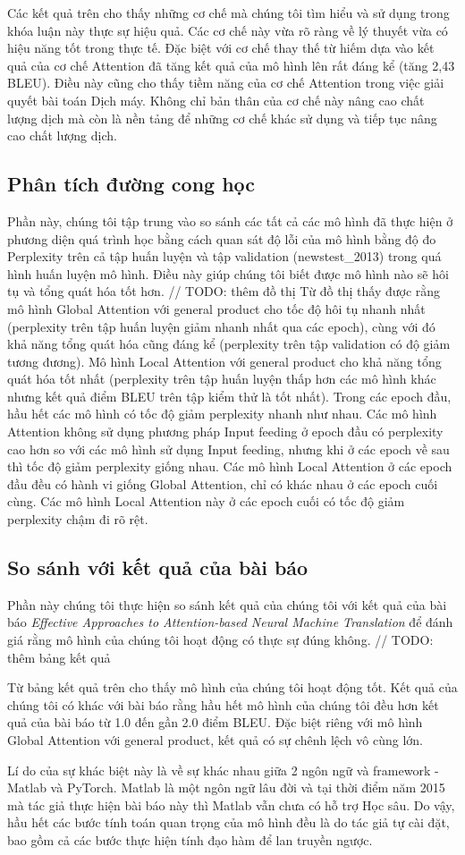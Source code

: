 Các kết quả trên cho thấy những cơ chế mà chúng tôi tìm hiểu và sử dụng trong khóa luận này thực sự hiệu quả. Các cơ chế này vừa rõ ràng về lý thuyết vừa có hiệu năng tốt trong thực tế. Đặc biệt với cơ chế thay thế từ hiếm dựa vào kết quả của cơ chế Attention đã tăng kết quả của mô hình lên rất đáng kể (tăng 2,43 BLEU). Điều này cũng cho thấy tiềm năng của cơ chế Attention trong việc giải quyết bài toán Dịch máy. Không chỉ bản thân của cơ chế này nâng cao chất lượng dịch mà còn là nền tảng để những cơ chế khác sử dụng và tiếp tục nâng cao chất lượng dịch.

\subsection{Phân tích đường cong học}
Phần này, chúng tôi tập trung vào so sánh các tất cả các mô hình đã thực hiện ở phương diện quá trình học bằng cách quan sát độ lỗi của mô hình bằng độ đo Perplexity trên cả tập huấn luyện và tập validation (newstest\_2013) trong quá hình huấn luyện mô hình. Điều này giúp chúng tôi biết được mô hình nào sẽ hôi tụ và tổng quát hóa tốt hơn.
// TODO: thêm đồ thị
Từ đồ thị thấy được rằng mô hình Global Attention với general product cho tốc độ hôi tụ nhanh nhất (perplexity trên tập huấn luyện giảm nhanh nhất qua các epoch), cùng với đó khả năng tổng quát hóa cũng đáng kể (perplexity trên tập validation có độ giảm tương đương). Mô hình Local Attention với general product cho khả năng tổng quát hóa tốt nhất (perplexity trên tập huấn luyện thấp hơn các mô hình khác nhưng kết quả điểm BLEU trên tập kiểm thử là tốt nhất). Trong các epoch đầu, hầu hết các mô hình có tốc độ giảm perplexity nhanh như nhau. Các mô hình Attention không sử dụng phương pháp Input feeding ở epoch đầu có perplexity cao hơn so với các mô hình sử dụng Input feeding, nhưng khi ở các epoch về sau thì tốc độ giảm perplexity giống nhau. Các mô hình Local Attention ở các epoch đầu đều có hành vi giống Global Attention, chỉ có khác nhau ở các epoch cuối cùng. Các mô hình Local Attention này ở các epoch cuối có tốc độ giảm perplexity chậm đi rõ rệt.

\subsection{So sánh với kết quả của bài báo}
Phần này chúng tôi thực hiện so sánh kết quả của chúng tôi với kết quả của bài báo \textit{Effective Approaches to Attention-based Neural Machine Translation} để đánh giá rằng mô hình của chúng tôi hoạt động có thực sự đúng không.
// TODO: thêm bảng kết quả

Từ bảng kết quả trên cho thấy mô hình của chúng tôi hoạt động tốt. Kết quả của chúng tôi có khác với bài báo rằng hầu hết mô hình của chúng tôi đều hơn kết quả của bài báo từ 1.0 đến gần 2.0 điểm BLEU. Đặc biệt riêng với mô hình Global Attention với general product, kết quả có sự chênh lệch vô cùng lớn.

Lí do của sự khác biệt này là về sự khác nhau giữa 2 ngôn ngữ và framework - Matlab và PyTorch. Matlab là một ngôn ngữ lâu đời và tại thời điểm năm 2015 mà tác giả thực hiện bài báo này thì Matlab vẫn chưa có hỗ trợ Học sâu. Do vậy, hầu hết các bước tính toán quan trọng của mô hình đều là do tác giả tự cài đặt, bao gồm cả các bước thực hiện tính đạo hàm để lan truyền ngược.